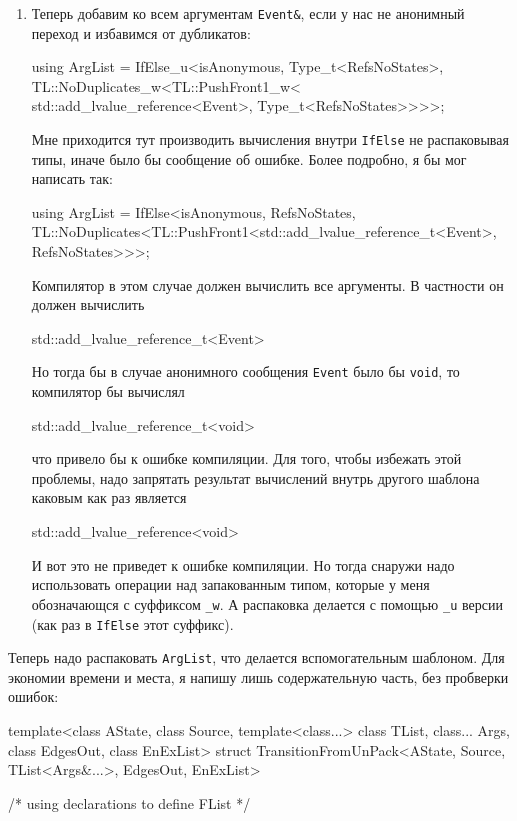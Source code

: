 \documentclass{article}
\begin{document}
{\begin{enumerate}
\item Теперь добавим ко всем аргументам \verb"Event&", если у нас не анонимный переход и избавимся от дубликатов:
\begin{cppcode}[\nonumbers]
using ArgList =
    IfElse_u<isAnonymous, Type_t<RefsNoStates>,
             TL::NoDuplicates_w<TL::PushFront1_w<
                 std::add_lvalue_reference<Event>, Type_t<RefsNoStates>>>>;
\end{cppcode}
Мне приходится тут производить вычисления внутри \verb"IfElse" не распаковывая типы, иначе было бы сообщение об ошибке.
Более подробно, я бы мог написать так:
\begin{cppcode}[\nonumbers]
using ArgList =
    IfElse<isAnonymous,
           RefsNoStates,
           TL::NoDuplicates<TL::PushFront1<std::add_lvalue_reference_t<Event>,
                                           RefsNoStates>>>;
\end{cppcode}
Компилятор в этом случае должен вычислить все аргументы.
В частности он должен вычислить 
\begin{cppcode}[\nonumbers]
std::add_lvalue_reference_t<Event>
\end{cppcode}
Но тогда бы в случае анонимного сообщения \verb"Event" было бы \verb"void", то компилятор бы вычислял
\begin{cppcode}[\nonumbers]
std::add_lvalue_reference_t<void>
\end{cppcode}
что привело бы к ошибке компиляции.
Для того, чтобы избежать этой проблемы, надо запрятать результат вычислений внутрь другого шаблона каковым как раз является
\begin{cppcode}[\nonumbers]
std::add_lvalue_reference<void>
\end{cppcode}
И вот это не приведет к ошибке компиляции.
Но тогда снаружи надо использовать операции над запакованным типом, которые у меня обозначающся с суффиксом \verb"_w".
А распаковка делается с помощью \verb"_u" версии (как раз в \verb"IfElse" этот суффикс).
\end{enumerate}
Теперь надо распаковать \verb"ArgList", что делается вспомогательным шаблоном.
Для экономии времени и места, я напишу лишь содержательную часть, без пробверки ошибок:
\begin{cppcode}
template<class AState, class Source, template<class...> class TList,
         class... Args, class EdgesOut, class EnExList>
struct TransitionFromUnPack<AState, Source, TList<Args&...>, EdgesOut,
                            EnExList> {
  /* using declarations to define FList */

}
\end{cppcode}}
\end{document}
